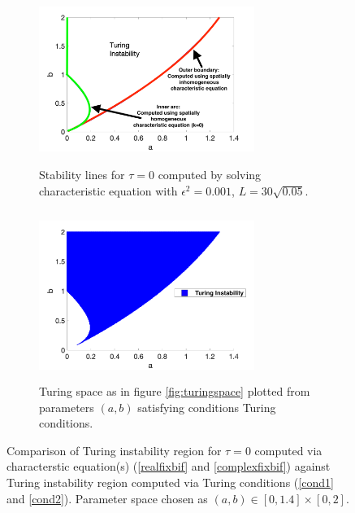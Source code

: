 \begin{figure}[H]
    \centering
    \begin{subfigure}[b]{0.47\textwidth}
        \centering
        \includegraphics[width=7cm,height = 5.5cm]{bif0.png}
        \caption{Stability lines for $\tau=0$ computed by solving characteristic equation with $\epsilon^2=0.001$, $L=30\sqrt{0.05}$.}
        \label{fig:bif0}
    \end{subfigure}
    \hfill
    \begin{subfigure}[b]{0.47\textwidth}
        \centering
        \includegraphics[width=7cm,height = 5.5cm]{turingspace.png}
        \caption{Turing space as in figure \ref{fig:turingspace} plotted from parameters $(a,b)$ satisfying conditions Turing conditions.}
        \label{}
    \end{subfigure}
    \caption{Comparison of Turing instability region for $\tau=0$ computed via characterstic equation(s) (\eqref{realfixbif} and \eqref{complexfixbif}) against Turing instability region computed via Turing conditions (\eqref{cond1} and \eqref{cond2}). Parameter space chosen as $(a,b)\in[0,1.4]\times[0,2]$.}
    \label{fig:tspace1}
\end{figure}

